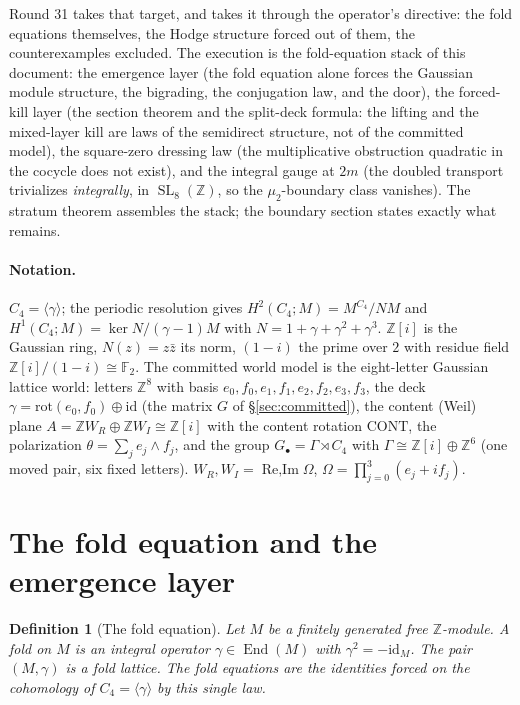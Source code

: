 \documentclass[11pt]{article}
\newcommand{\Z}{\mathbb Z}
\newcommand{\F}{\mathbb F}
\newcommand{\SL}{\operatorname{SL}}
\newcommand{\End}{\operatorname{End}}
\newtheorem{definition}[theorem]{Definition}
\begin{document}
Round 31 takes that target, and takes it through the operator's
directive: the fold equations themselves, the Hodge structure forced
out of them, the counterexamples excluded. The execution is the
fold-equation stack of this document: the emergence layer (the fold
equation alone forces the Gaussian module structure, the bigrading, the
conjugation law, and the door), the forced-kill layer (the section
theorem and the split-deck formula: the lifting and the mixed-layer
kill are laws of the semidirect structure, not of the committed
model), the square-zero dressing law (the multiplicative obstruction
quadratic in the cocycle does not exist), and the integral gauge at
$2m$ (the doubled transport trivializes \emph{integrally}, in
$\SL_8(\Z)$, so the $\mu_2$-boundary class vanishes). The stratum
theorem assembles the stack; the boundary section states exactly what
remains.

\paragraph{Notation.} $C_4=\langle\gamma\rangle$; the periodic
resolution gives $H^2(C_4;M)=M^{C_4}/NM$ and
$H^1(C_4;M)=\ker N/(\gamma-1)M$ with $N=1+\gamma+\gamma^2+\gamma^3$.
$\Z[i]$ is the Gaussian ring, $N(z)=z\bar z$ its norm,
$(1-i)$ the prime over $2$ with residue field $\Z[i]/(1-i)\cong\F_2$.
The committed world model is the eight-letter Gaussian lattice world:
letters $\Z^8$ with basis
$e_0,f_0,e_1,f_1,e_2,f_2,e_3,f_3$, the deck
$\gamma=\mathrm{rot}(e_0,f_0)\oplus\mathrm{id}$ (the matrix $G$ of
\S\ref{sec:committed}), the content (Weil) plane
$A=\Z W_R\oplus\Z W_I\cong\Z[i]$ with the content rotation
$\mathrm{CONT}$, the polarization
$\theta=\sum_j e_j\!\wedge f_j$, and the group
$G_\bullet=\Gamma\rtimes C_4$ with
$\Gamma\cong\Z[i]\oplus\Z^6$ (one moved pair, six fixed letters).
$W_R,W_I=\operatorname{Re,Im}\Omega$,
$\Omega=\prod_{j=0}^3(e_j+if_j)$.

\section{The fold equation and the emergence layer}\label{sec:emergence}

\begin{definition}[The fold equation]\label{def:fold}
Let $M$ be a finitely generated free $\Z$-module. A \emph{fold} on $M$
is an integral operator $\gamma\in\End(M)$ with
$\gamma^2=-\mathrm{id}_M$. The pair $(M,\gamma)$ is a \emph{fold
lattice}. The \emph{fold equations} are the identities forced on the
cohomology of $C_4=\langle\gamma\rangle$ by this single law.
\end{definition}
\end{document}

